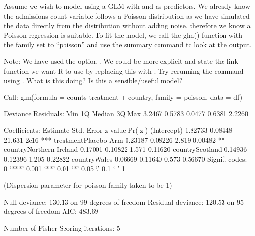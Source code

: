 \documentclass[letterpaper,10pt,english]{jupyterBook}
\begin{document}
\sphinxAtStartPar
Assume we wish to model  using a GLM with  and  as predictors. We already know the admissions count variable follows a Poisson distribution as we have simulated the data directly from the distribution without adding noise, therefore we know a Poisson regression is suitable. To fit the model, we call the glm() function with the family set to “poisson” and use the summary command to look at the output.

\sphinxAtStartPar
Note: We have used the option . We could be more explicit and state the link function we want R to use by replacing this with . Try re\sphinxhyphen{}running the command using . What is this doing? Is this a sensible/useful model?

\begin{sphinxVerbatim}[commandchars=\\\{\}]
        
\end{sphinxVerbatim}

\begin{sphinxVerbatim}[commandchars=\\\{\}]
Call:
glm(formula = counts \PYGZti{} treatment + country, family = poisson, 
    data = df)

Deviance Residuals: 
    Min       1Q   Median       3Q      Max  
\PYGZhy{}3.2467  \PYGZhy{}0.5783   0.0477   0.6381   2.2260  

Coefficients:
                        Estimate Std. Error z value Pr(\PYGZgt{}|z|)    
(Intercept)              1.82733    0.08448  21.631  \PYGZlt{} 2e\PYGZhy{}16 ***
treatmentPlacebo Arm    \PYGZhy{}0.23187    0.08226  \PYGZhy{}2.819  0.00482 ** 
countryNorthern Ireland  0.17001    0.10822   1.571  0.11620    
countryScotland          0.14936    0.12396   1.205  0.22822    
countryWales             0.06669    0.11640   0.573  0.56670    
\PYGZhy{}\PYGZhy{}\PYGZhy{}
Signif. codes:  0 ‘***’ 0.001 ‘**’ 0.01 ‘*’ 0.05 ‘.’ 0.1 ‘ ’ 1

(Dispersion parameter for poisson family taken to be 1)

    Null deviance: 130.13  on 99  degrees of freedom
Residual deviance: 120.53  on 95  degrees of freedom
AIC: 483.69

Number of Fisher Scoring iterations: 5
\end{sphinxVerbatim}
\end{document}
